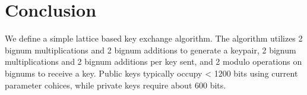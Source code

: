 \documentclass[preprint]{iacrtrans}
\begin{document}
\section{Conclusion}
 We define a simple lattice based key exchange algorithm. The algorithm utilizes 2 bignum multiplications and 2 bignum additions to generate a keypair, 2 bignum multiplications and 2 bignum additions per key sent, and 2 modulo operations on bignums to receive a key. Public keys typically occupy < 1200 bits using current parameter cohices, while private keys require about 600 bits.
\end{document}
